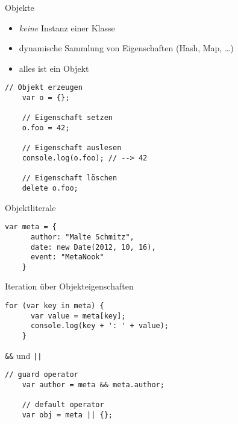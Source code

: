 \begin{frame}[fragile]{Objekte}
  \begin{itemize}
    \item \emph{keine} Instanz einer Klasse
    \item dynamische Sammlung von Eigenschaften (Hash, Map, \ldots)
    \item alles ist ein Objekt
  \end{itemize}
    
  \begin{lstlisting}[gobble=4]
    // Objekt erzeugen
    var o = {};
    
    // Eigenschaft setzen
    o.foo = 42;
    
    // Eigenschaft auslesen
    console.log(o.foo); // --> 42
    
    // Eigenschaft löschen
    delete o.foo;
  \end{lstlisting}  
\end{frame}

\begin{frame}[fragile]{Objektliterale}
  \begin{lstlisting}[gobble=4]
    var meta = {
      author: "Malte Schmitz",
      date: new Date(2012, 10, 16),
      event: "MetaNook"
    }
  \end{lstlisting}
\end{frame}

\begin{frame}[fragile]{Iteration über Objekteigenschaften}
  \begin{lstlisting}[gobble=4]
    for (var key in meta) {
      var value = meta[key];
      console.log(key + ': ' + value);
    }
  \end{lstlisting}
\end{frame}

\begin{frame}[fragile]{\texttt{\&\&} und \texttt{||}}
  \begin{lstlisting}[gobble=4]
    // guard operator
    var author = meta && meta.author;
    
    // default operator
    var obj = meta || {};
  \end{lstlisting}
\end{frame}



